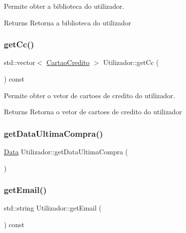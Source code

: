 Permite obter a biblioteca do utilizador. 

\begin{DoxyReturn}{Returns}
Retorna a biblioteca do utilizador 
\end{DoxyReturn}
\mbox{\label{class_utilizador_ad0ebe5ff80aa77145ec4b0ce5473102c}} 
\subsubsection{\texorpdfstring{get\+Cc()}{getCc()}}
{\footnotesize\ttfamily std\+::vector$<$ \mbox{\hyperlink{class_cartao_credito}{Cartao\+Credito}} $>$ Utilizador\+::get\+Cc (\begin{DoxyParamCaption}{ }\end{DoxyParamCaption}) const}



Permite obter o vetor de cartoes de credito do utilizador. 

\begin{DoxyReturn}{Returns}
Retorna o vetor de cartoes de credito do utilizador 
\end{DoxyReturn}
\mbox{\label{class_utilizador_a68fcb8d8b1ebce49da37439aaa1a7b79}} 
\subsubsection{\texorpdfstring{get\+Data\+Ultima\+Compra()}{getDataUltimaCompra()}}
{\footnotesize\ttfamily \mbox{\hyperlink{class_data}{Data}} Utilizador\+::get\+Data\+Ultima\+Compra (\begin{DoxyParamCaption}{ }\end{DoxyParamCaption})\hspace{0.3cm}{\ttfamily [inline]}}

\mbox{\label{class_utilizador_aea88bb297704762d0cccc909b8c2da54}} 
\subsubsection{\texorpdfstring{get\+Email()}{getEmail()}}
{\footnotesize\ttfamily std\+::string Utilizador\+::get\+Email (\begin{DoxyParamCaption}{ }\end{DoxyParamCaption}) const}




